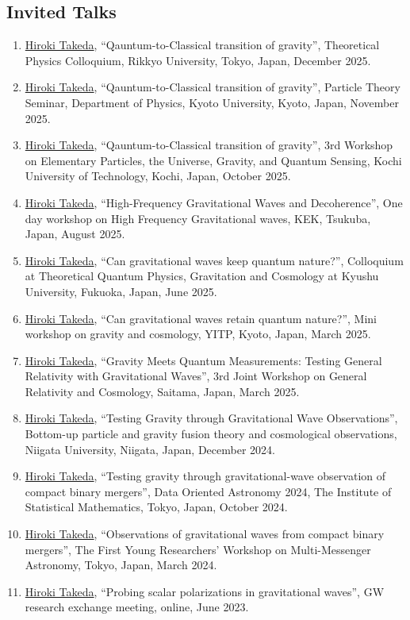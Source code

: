 \documentclass[uplatex, 12pt]{article}
\begin{document}
\subsection*{Invited Talks}
\begin{enumerate}
\item \uline{Hiroki Takeda}, “Qauntum-to-Classical transition of gravity”, Theoretical Physics Colloquium, Rikkyo University, Tokyo, Japan, December 2025.
\item \uline{Hiroki Takeda}, “Qauntum-to-Classical transition of gravity”, Particle Theory Seminar, Department of Physics, Kyoto University, Kyoto, Japan, November 2025.
\item \uline{Hiroki Takeda}, “Qauntum-to-Classical transition of gravity”, 3rd Workshop on Elementary Particles, the Universe, Gravity, and Quantum Sensing, Kochi University of Technology, Kochi, Japan, October 2025.
\item \uline{Hiroki Takeda}, “High-Frequency Gravitational Waves and Decoherence”, One day workshop on High Frequency Gravitational waves, KEK, Tsukuba, Japan, August 2025.
\item \uline{Hiroki Takeda}, “Can gravitational waves keep quantum nature?”, Colloquium at Theoretical Quantum Physics, Gravitation and Cosmology at Kyushu University, Fukuoka, Japan, June 2025.
\item \uline{Hiroki Takeda}, “Can gravitational waves retain quantum nature?”, Mini workshop on gravity and cosmology, YITP, Kyoto, Japan, March 2025.
\item \uline{Hiroki Takeda}, “Gravity Meets Quantum Measurements: Testing General Relativity with Gravitational Waves”, 3rd Joint Workshop on General Relativity and Cosmology, Saitama, Japan, March 2025.
\item \uline{Hiroki Takeda}, “Testing Gravity through Gravitational Wave Observations”, Bottom-up particle and gravity fusion theory and cosmological observations, Niigata University, Niigata, Japan, December 2024.
\item \uline{Hiroki Takeda}, “Testing gravity through gravitational-wave observation of compact binary mergers”, Data Oriented Astronomy 2024, The Institute of Statistical Mathematics, Tokyo, Japan, October 2024.
\item \uline{Hiroki Takeda}, “Observations of gravitational waves from compact binary mergers”, The First Young Researchers' Workshop on Multi-Messenger Astronomy, Tokyo, Japan, March 2024.
\item \uline{Hiroki Takeda}, “Probing scalar polarizations in gravitational waves”, GW research exchange meeting, online, June 2023.

\end{enumerate}
\end{document}
